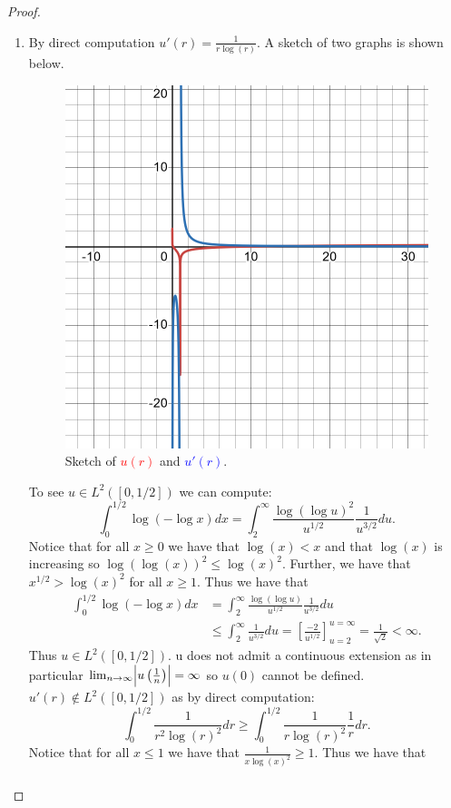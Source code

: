 \documentclass{amsart}
\theoremstyle{plain}
\theoremstyle{definition}
\begin{document}
\begin{proof}
    \begin{enumerate}[label=\alph*.]
        \item By direct computation $u'(r) = \frac{1}{r\log(r)}$. A sketch of two graphs is shown below.
        \begin{figure}[h!]
            \centering
            \includegraphics[width=0.5\linewidth]{Chapter 1/Photos/Problem12A.png}
            \caption{Sketch of \textcolor{red}{$u(r)$} and \textcolor{blue}{$u'(r)$}.}
            \label{fig:12a}
        \end{figure}
        To see $u\in L^2([0,1/2])$ we can compute:
        $$\int_0^{1/2} \log\left(-\log x\right) dx = \int_{2}^{\infty} \frac{\log\left(\log u\right)^2}{u^{1/2}}\frac{1}{u^{3/2}}du.$$ Notice that for all $x\geq 0$ we have that $\log(x) < x$ and that $\log(x)$ is increasing so $\log(\log(x))^2 \leq \log(x)^2.$ 
        Further, we have that $x^{1/2} > \log(x)^2$ for all $x\geq 1$. Thus we have that
        \begin{align*}
            \int_0^{1/2} \log\left(-\log x\right) dx &= \int_{2}^{\infty} \frac{\log\left(\log u\right)}{u^{1/2}}\frac{1}{u^{3/2}}du\\
            &\leq \int_2^\infty \frac{1}{u^{3/2}} du = \left[\frac{-2}{u^{1/2}}\right]_{u=2}^{u=\infty} =  \frac{1}{\sqrt{2}} < \infty.
        \end{align*}
        Thus $u\in L^2([0,1/2]).$ u does not admit a continuous extension as in particular $\lim_{n\to\infty} \abs{u\left(\frac{1}{n}\right)} = \infty$ so $u(0)$ cannot be defined. $u'(r)\not \in L^2([0,1/2])$ as by direct computation:
        $$\int_{0}^{1/2} \frac{1}{r^2\log(r)^2} dr \geq \int_{0}^{1/2} \frac{1}{r\log(r)^2} \frac{1}{r}dr.$$
        Notice that for all $x\leq 1$ we have that
        $\frac{1}{x\log(x)^2} \geq 1.$ Thus we have that 
        \begin{align*}

\end{align*}
\end{enumerate}
\end{proof}
\end{document}

